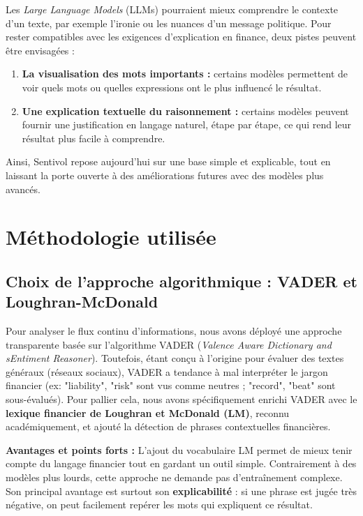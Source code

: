 \documentclass[11pt,a4paper]{article}
\begin{document}
Les \textit{Large Language Models} (LLMs) pourraient mieux comprendre le contexte d'un texte, par exemple l'ironie ou les nuances d'un message politique. Pour rester compatibles avec les exigences d'explication en finance, deux pistes peuvent être envisagées :
\begin{enumerate}
    \item \textbf{La visualisation des mots importants :} certains modèles permettent de voir quels mots ou quelles expressions ont le plus influencé le résultat.
    \item \textbf{Une explication textuelle du raisonnement :} certains modèles peuvent fournir une justification en langage naturel, étape par étape, ce qui rend leur résultat plus facile à comprendre.
\end{enumerate}

Ainsi, Sentivol repose aujourd'hui sur une base simple et explicable, tout en laissant la porte ouverte à des améliorations futures avec des modèles plus avancés.

\newpage
\section{Méthodologie utilisée}

\subsection{Choix de l'approche algorithmique : VADER et Loughran-McDonald}
Pour analyser le flux continu d'informations, nous avons déployé une approche transparente basée sur l'algorithme VADER (\textit{Valence Aware Dictionary and sEntiment Reasoner}). Toutefois, étant conçu à l'origine pour évaluer des textes généraux (réseaux sociaux), VADER a tendance à mal interpréter le jargon financier (ex: "liability", "risk" sont vus comme neutres ; "record", "beat" sont sous-évalués).
Pour pallier cela, nous avons spécifiquement enrichi VADER avec le \textbf{lexique financier de Loughran et McDonald (LM)}, reconnu académiquement, et ajouté la détection de phrases contextuelles financières.

\textbf{Avantages et points forts :} 
L'ajout du vocabulaire LM permet de mieux tenir compte du langage financier tout en gardant un outil simple. Contrairement à des modèles plus lourds, cette approche ne demande pas d'entraînement complexe. Son principal avantage est surtout son \textbf{explicabilité} : si une phrase est jugée très négative, on peut facilement repérer les mots qui expliquent ce résultat.
\end{document}
